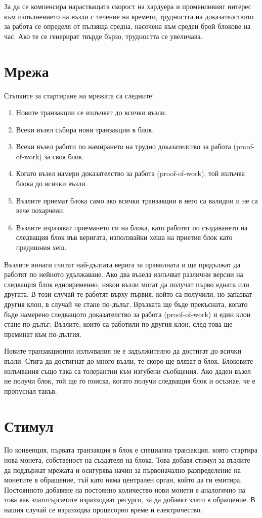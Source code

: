 \documentclass[11pt,a4paper]{article}
\begin{document}
За да се компенсира нарастващата скорост на хардуера и променливият интерес към изпълнението на възли с течение на времето, трудността на доказателството за работа се определя от пълзяща средна, насочена към среден брой блокове на час. Ако те се генерират твърде бързо, трудността се увеличава.

\section{Мрежа}
Стъпките за стартиране на мрежата са следните:

\begin{enumerate}
	\item Новите транзакции се излъчват до всички възли.
	\item Всеки възел събира нови транзакции в блок.
	\item Всеки възел работи по намирането на трудно доказателство за работа (proof-of-work) за своя блок.
	\item Когато възел намери доказателство за работа (proof-of-work), той излъчва блока до всички възли.
	\item Възлите приемат блока само ако всички транзакции в него са валидни и не са вече похарчени.
	\item Възлите изразяват приемането си на блока, като работят по създаването на следващия блок във веригата, използвайки хеша на приетия блок като предишния хеш.
\end{enumerate}

Възлите винаги считат най-дългата верига за правилната и ще продължат да работят по нейното удължаване. Ако два възела излъчват различни версии на следващия блок едновременно, някои възли могат да получат първо едната или другата. В този случай те работят върху първия, който са получили, но запазват другия клон, в случай че стане по-дълъг. Връзката ще бъде прекъсната, когато бъде намерено следващото доказателство за работа (proof-of-work) и един клон стане по-дълъг; Възлите, които са работили по другия клон, след това ще преминат към по-дългия.

Новите транзакционни излъчвания не е задължително да достигат до всички възли. Стига да достигнат до много възли, те скоро ще влязат в блок. Блоковите излъчвания също така са толерантни към изгубени съобщения. Ако даден възел не получи блок, той ще го поиска, когато получи следващия блок и осъзнае, че е пропуснал такъв.

\section{Стимул}
По конвенция, първата транзакция в блок е специална транзакция, която стартира нова монета, собственост на създателя на блока. Това добавя стимул за възлите да поддържат мрежата и осигурява начин за първоначално разпределение на монетите в обращение, тъй като няма централен орган, който да ги емитира. Постоянното добавяне на постоянно количество нови монети е аналогично на това как златотърсачите изразходват ресурси, за да добавят злато в обращение. В нашия случай се изразходва процесорно време и електричество.
\end{document}
